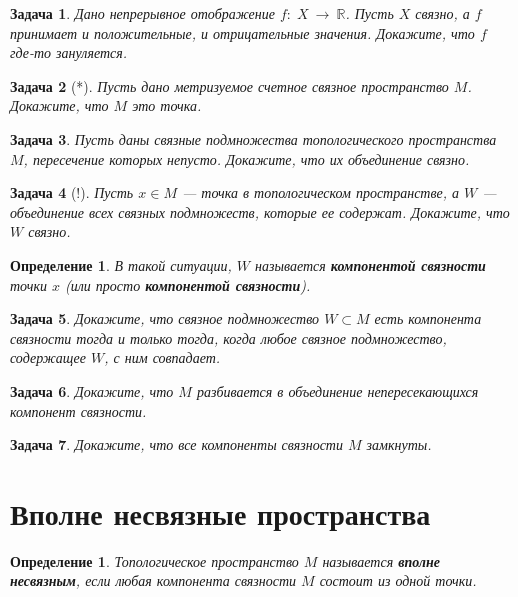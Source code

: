 \documentclass[12pt]{book}
\newcommand{\subs}{\section}
\newcommand{\arrow}{{\:\longrightarrow\:}}
\def\R{{\mathbb R}}
\theoremstyle{upshape}
\newtheorem{zadacha}{Задача}[chapter]
\theoremstyle{generic}
\newtheorem{opredelenie}[teorema]{Определение}
\theoremstyle{upshapenonumber}
\newcommand{\следствие}{%
     \refstepcounter{teorema}
     {\noindent\bf Следствие \thechapter.\arabic{teorema}:\ }}
\newcommand{\пример}{%
     \refstepcounter{teorema}
     {\noindent\bf Пример \thechapter.\arabic{teorema}:\ }}
\newcommand{\лемма}{%
     \refstepcounter{teorema}
     {\noindent\bf Лемма \thechapter.\arabic{teorema}:\ }}
\newcommand{\теорема}{%
     \refstepcounter{teorema}
     {\noindent\bf Теорема \thechapter.\arabic{teorema}:\ }}
\newcommand{\утверждение}{%
     \refstepcounter{teorema}
     {\noindent\bf Утверждение \thechapter.\arabic{teorema}:\ }}
\begin{document}
{\begin{zadacha}
Дано непрерывное отображение
$f:\; X \arrow \R$. Пусть $X$ связно,
а $f$ принимает и положительные, и отрицательные
значения. Докажите, что $f$ где-то зануляется.
\end{zadacha}

\begin{zadacha}[*]
Пусть дано метризуемое
счетное связное пространство $M$. Докажите,
что $M$ это точка.
\end{zadacha}

\begin{zadacha} Пусть даны связные 
подмножества топологического пространства $M$, 
пересечение которых непусто.
Докажите, что их объединение связно.
\end{zadacha}


\begin{zadacha}[!]
Пусть $x\in M$ --- точка в топологическом пространстве,
а $W$ --- объединение всех связных подмножеств, которые
ее содержат. Докажите, что $W$ связно.
\end{zadacha}


\begin{opredelenie}
В такой ситуации, $W$ называется {\bf компонентой
связности} точки $x$ (или просто {\bf компонентой связности}).
\end{opredelenie}

\begin{zadacha}
Докажите, что связное подмножество $W\subset M$ есть компонента
связности тогда и только тогда, когда любое связное
подмножество, содержащее $W$, с ним совпадает.
\end{zadacha}

\begin{zadacha}
Докажите, что $M$ разбивается в объединение
непересекающихся компонент связности.
\end{zadacha}

\begin{zadacha}
Докажите, что все компоненты связности $M$ замкнуты.
\end{zadacha}

\subs{Вполне несвязные пространства}

\begin{opredelenie}
Топологическое пространство $M$ называется {\bf вполне несвязным},
если любая компонента связности $M$ состоит из одной точки.
\end{opredelenie}

}
\end{document}
